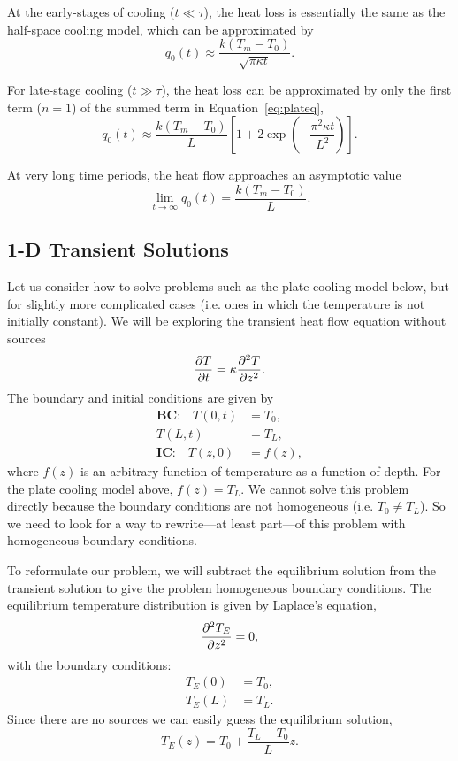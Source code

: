 At the early-stages of cooling ($t \ll \tau$), the heat loss is essentially the same as the half-space cooling model, which can be approximated by
\begin{equation}
    q_{0}(t) \approx \frac{k (T_{m} - T_{0})}{\sqrt{\pi \kappa t}}.
\end{equation}

For late-stage cooling ($t \gg \tau$), the heat loss can be approximated by only the first term ($n = 1$) of the summed term in Equation~\ref{eq:plateq},
\begin{equation}
    q_{0}(t) \approx \frac{k (T_{m} - T_{0})}{L}
        \left[ 1 + 2 \exp\left( -\frac{\pi^2 \kappa t}{L^2}\right) \right].
\end{equation}

At very long time periods, the heat flow approaches an asymptotic value
\begin{equation}
    \lim_{t \to \infty} q_{0}(t) = \frac{k (T_{m} - T_{0})}{L}.
\end{equation}


\subsection{1-D Transient Solutions}\label{sec:fseries}

Let us consider how to solve problems such as the plate cooling model below, but for slightly more complicated cases (i.e. ones in which the temperature is not initially constant).  We will be exploring the transient heat flow equation without sources
\begin{equation}
    \pdv{T}{t} = \kappa \pdv[2]{T}{z} .
\end{equation}
The boundary and initial conditions are given by
\begin{align}
    \textbf{BC:} \quad T(0,t) &= T_0 , \\
    T(L,t) &= T_L , \\
    \textbf{IC:} \quad T(z,0) &= f(z),
\end{align}
where $f(z)$ is an arbitrary function of temperature as a function of depth.  For the plate cooling model above, $f(z) = T_L$.  We cannot solve this problem directly because the boundary conditions are not homogeneous (i.e. $T_0 \neq T_L$).  So we need to look for a way to rewrite---at least part---of this problem with homogeneous boundary conditions.

To reformulate our problem, we will subtract the equilibrium solution from the transient solution to give the problem homogeneous boundary conditions.  The equilibrium temperature distribution is given by Laplace's equation,
\begin{equation}
    \pdv[2]{T_E}{z} = 0 ,
\end{equation}
with the boundary conditions:
\begin{align}
    T_E(0) &= T_0 , \\
    T_E(L) &= T_L .
\end{align}
Since there are no sources we can easily guess the equilibrium solution,
\begin{equation}
    T_E(z) = T_0 + \frac{T_L - T_0}{L} z .
\end{equation}

